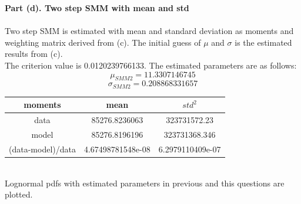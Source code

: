 \documentclass[letterpaper,12pt]{article}
\theoremstyle{definition}
\begin{document}
\clearpage

\noindent\textbf{Part (d). Two step SMM with mean and std} \\
\\
Two step SMM is estimated with mean and standard deviation as moments and weighting matrix derived from (c). The initial guess of $\mu$ and $\sigma$ is the estimated results from (c). \\
The criterion value is 0.0120239766133. The estimated parameters are as follows:
\[\mu_{SMM2}= 11.3307146745\]
\[\sigma_{SMM2}= 0.208868331657\]

\begin{center}
\begin{tabular}{ c|c|c }
 moments & mean & $std^2$ \\
 \hline
 data & 85276.8236063 & 323731572.23 \\
 model & 85276.8196196 & 323731368.346 \\
 (data-model)/data & 4.67498781548e-08 & 6.2979110409e-07
\end{tabular}
\end{center}
\\

Lognormal pdfs with estimated parameters in previous and this questions are plotted. \\

\begin{figure}[htb]\centering\captionsetup{width=6.0in}
  \caption{\textbf{}}
\end{figure} \\
\end{document}
